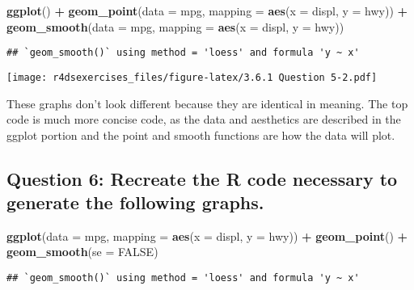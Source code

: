 \documentclass[
]{book}
\newenvironment{Shaded}{\begin{snugshade}}{\end{snugshade}}
\newcommand{\DataTypeTok}[1]{\textcolor[rgb]{0.13,0.29,0.53}{#1}}
\newcommand{\KeywordTok}[1]{\textcolor[rgb]{0.13,0.29,0.53}{\textbf{#1}}}
\newcommand{\NormalTok}[1]{#1}
\newcommand{\OperatorTok}[1]{\textcolor[rgb]{0.81,0.36,0.00}{\textbf{#1}}}
\newcommand{\OtherTok}[1]{\textcolor[rgb]{0.56,0.35,0.01}{#1}}
\newcommand{\StringTok}[1]{\textcolor[rgb]{0.31,0.60,0.02}{#1}}
\begin{document}
\begin{Shaded}
\begin{Highlighting}[]
\KeywordTok{ggplot}\NormalTok{() }\OperatorTok{+}\StringTok{ }
\StringTok{  }\KeywordTok{geom_point}\NormalTok{(}\DataTypeTok{data =}\NormalTok{ mpg, }\DataTypeTok{mapping =} \KeywordTok{aes}\NormalTok{(}\DataTypeTok{x =}\NormalTok{ displ, }\DataTypeTok{y =}\NormalTok{ hwy)) }\OperatorTok{+}\StringTok{ }
\StringTok{  }\KeywordTok{geom_smooth}\NormalTok{(}\DataTypeTok{data =}\NormalTok{ mpg, }\DataTypeTok{mapping =} \KeywordTok{aes}\NormalTok{(}\DataTypeTok{x =}\NormalTok{ displ, }\DataTypeTok{y =}\NormalTok{ hwy))}
\end{Highlighting}
\end{Shaded}

\begin{verbatim}
## `geom_smooth()` using method = 'loess' and formula 'y ~ x'
\end{verbatim}

\texttt{[image: r4dsexercises\_files/figure-latex/3.6.1 Question 5-2.pdf]}

These graphs don't look different because they are identical in meaning. The top code is much more concise code, as the data and aesthetics are described in the ggplot portion and the point and smooth functions are how the data will plot.

\hypertarget{question-6-recreate-the-r-code-necessary-to-generate-the-following-graphs.}{%
\subsection{Question 6: Recreate the R code necessary to generate the following graphs.}\label{question-6-recreate-the-r-code-necessary-to-generate-the-following-graphs.}}

\begin{Shaded}
\begin{Highlighting}[]
\KeywordTok{ggplot}\NormalTok{(}\DataTypeTok{data =}\NormalTok{ mpg, }\DataTypeTok{mapping =} \KeywordTok{aes}\NormalTok{(}\DataTypeTok{x =}\NormalTok{ displ, }\DataTypeTok{y =}\NormalTok{ hwy)) }\OperatorTok{+}\StringTok{ }
\StringTok{  }\KeywordTok{geom_point}\NormalTok{() }\OperatorTok{+}\StringTok{ }
\StringTok{  }\KeywordTok{geom_smooth}\NormalTok{(}\DataTypeTok{se =} \OtherTok{FALSE}\NormalTok{)}
\end{Highlighting}
\end{Shaded}

\begin{verbatim}
## `geom_smooth()` using method = 'loess' and formula 'y ~ x'
\end{verbatim}
\end{document}
